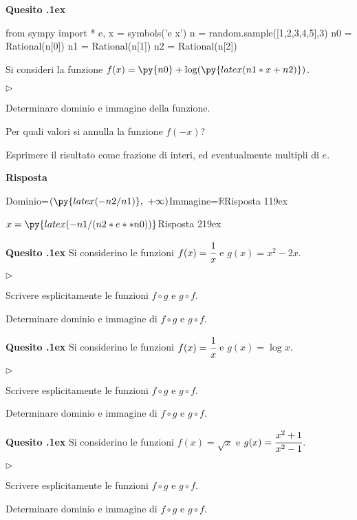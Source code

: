 \documentclass[11pt,twoside,a4paper]{article}
\newcommand{\mylabel}[1]{#1\hfill}
\renewenvironment{itemize}
  {\begin{list}{$\triangleright$}{%
   \setlength{\parskip}{0mm}
   \setlength{\topsep}{.4\baselineskip}
   \setlength{\rightmargin}{0mm}
   \setlength{\listparindent}{0mm}
   \setlength{\itemindent}{0mm}
   \setlength{\labelwidth}{2ex}
   \setlength{\itemsep}{.4\baselineskip}
   \setlength{\parsep}{0mm}
   \setlength{\partopsep}{0mm}
   \setlength{\labelsep}{1ex}
   \setlength{\leftmargin}{\labelwidth+\labelsep}
   \let\makelabel\mylabel}}{%
   \end{list}\vspace*{-1.3mm}}
\newcounter{quesito}
\newenvironment{question}{\bigskip\addtocounter{quesito}{1}\bigskip\bigskip\par\textbf{Quesito \thequesito.\kern1ex}}{\vspace{\parskip}}
\newenvironment{answer}{\par\textbf{Risposta\quad}}{\vspace{\parskip}}
\begin{document}
\begin{question}
\def\RR{{\mathds R}}
\begin{pycode}
from sympy import *
e, x = symbols('e x')
n = random.sample([1,2,3,4,5],3)
n0 = Rational(n[0])
n1 = Rational(n[1])
n2 = Rational(n[2])
\end{pycode}
Si consideri la funzione $f(x) = \py{n0} + \log(\py{ latex( n1*x+n2 ) } )$.
\begin{itemize}
\item[1.] Determinare dominio e immagine della funzione. 
\item[2.] Per quali valori si annulla la funzione $f(-x)$?
\end{itemize}
Esprimere il risultato come frazione di interi, ed eventualmente multipli di $e$.
\begin{answer}

\end{answer}

{\color{blue} Dominio=$\displaystyle\left(\py{latex(-n2/n1)},\ +\infty\right)$\qquad Immagine=$\RR$\hfill Risposta 1\kern19ex}

{\color{blue}$\displaystyle x=\py{latex(-n1/(n2*e**n0))}$\hfill Risposta 2\kern19ex}

\end{question}

\begin{question}
Si considerino le funzioni $f(x) = \cfrac{1}{x}$ e $g(x) = x^2 - 2x$.
\begin{itemize}
\item[1.] Scrivere esplicitamente le funzioni $f \circ g$ e $g \circ f$.
\item[2.] Determinare dominio e immagine di $f \circ g$ e $g \circ f$.
\end{itemize}
\end{question}

\begin{question}
Si considerino le funzioni $f(x) = \cfrac{1}{x}$ e $g(x) = \log x$.
\begin{itemize}
\item[1.] Scrivere esplicitamente le funzioni $f \circ g$ e $g \circ f$.
\item[2.] Determinare dominio e immagine di $f \circ g$ e $g \circ f$.
\end{itemize}
\end{question}

\begin{question}
Si considerino le funzioni $f(x) = \sqrt{x}$ e $g(x) = \cfrac{x^2 + 1}{x^2 - 1}$.
\begin{itemize}
\item[1.] Scrivere esplicitamente le funzioni $f \circ g$ e $g \circ f$.
\item[2.] Determinare dominio e immagine di $f \circ g$ e $g \circ f$.
\end{itemize}
\end{question}
\end{document}
